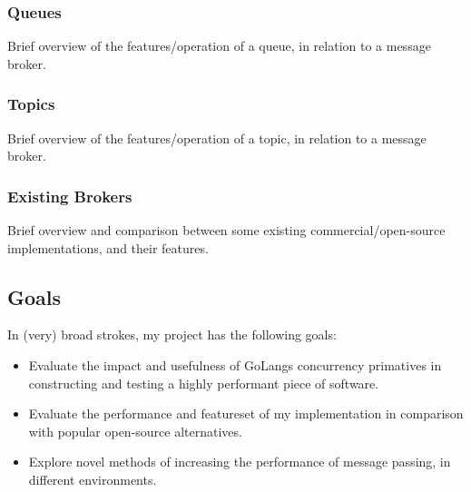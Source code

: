 \subsubsection{Queues}
\label{subs:Queues}

Brief overview of the features/operation of a queue, in relation to a message broker.


\subsubsection{Topics}
\label{subs:Topics}

Brief overview of the features/operation of a topic, in relation to a message broker.

\subsubsection{Existing Brokers}
\label{subs:Existing Brokers}

Brief overview and comparison between some existing commercial/open-source
implementations, and their features.

\subsection{Goals}
 In (very) broad strokes, my project has the following goals:

 \begin{itemize}
   \item Evaluate the impact and usefulness of GoLangs concurrency primatives in
   constructing and testing a highly performant piece of software.
   \item Evaluate the performance and featureset of my implementation in
   comparison with popular open-source alternatives.
   \item Explore novel methods of increasing the performance of message passing,
   in different environments.
 \end{itemize}
